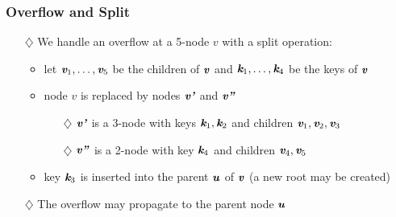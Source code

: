 \documentclass[pdf,
serif,
compress,
xcolor=table,
dvipsnames,
spanish,
aspectratio=169]{beamer}
\begin{document}
\begin{frame}
    \frametitle{Overflow and Split}
    \begin{itemize}
    \color{purpura}
        \item[\(\diamondsuit\)] We handle an \textcolor{naranja}{overflow} at a 5-node \(v\) with a \textcolor{naranja}{split operation}:
        \begin{itemize}
            \color{purpura}
            \item let \(\textit{\textbf{v}}_1, \ldots, \textit{\textbf{v}}_5\) be the children of \(\textbf{\textit{v}}\) and  \(\textit{\textbf{k}}_1, \ldots, \textit{\textbf{k}}_4\) be the keys of \(\textbf{\textit{v}}\)
    
            \item node \(v\) is replaced by nodes \(\textbf{\textit{v'}}\) and \(\textbf{\textit{v''}}\)
            \begin{itemize}
                \color{purpura}
                \item[\(\diamondsuit\)] \(\textbf{\textit{v'}}\) is a 3-node with keys \(\textit{\textbf{k}}_1, \textit{\textbf{k}}_2\) and children \(\textit{\textbf{v}}_1, \textit{\textbf{v}}_2, \textit{\textbf{v}}_3\)
    
                \item[\(\diamondsuit\)] \(\textbf{\textit{v''}}\) is a 2-node with key \(\textit{\textbf{k}}_4\) and children \(\textit{\textbf{v}}_4, \textit{\textbf{v}}_5\)
            \end{itemize}
    
            \item key \(\textit{\textbf{k}}_3\) is inserted into the parent \(\textbf{\textit{u}}\) of \(\textbf{\textit{v}}\) (a new root may be created)
        \end{itemize}
            
        \item[\(\diamondsuit\)] The overflow may propagate to the parent node \(\textbf{\textit{u}}\)
    \end{itemize}

    \begin{minipage}{0.43\linewidth}
\end{minipage}
\end{frame}
\end{document}
